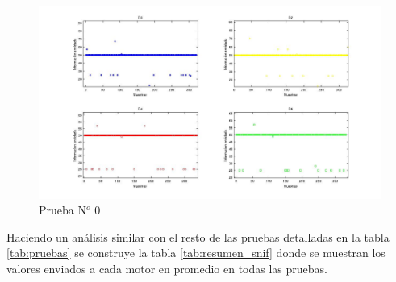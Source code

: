 \documentclass[main]{subfiles}
\begin{document}
\begin{figure}[h!]
	\centering
	\includegraphics[width=1\textwidth]{./pics_sniffer/grafica_ejemplo.jpg}
	\caption{Prueba N$^o$ $0$}
	\label{fig:grafica_motores}
\end{figure}


Haciendo un an\'alisis similar con el resto de las pruebas detalladas en la tabla \ref{tab:pruebas} se construye la tabla \ref{tab:resumen_snif} donde se muestran los valores enviados a cada motor en promedio en todas las pruebas.\\
\end{document}
